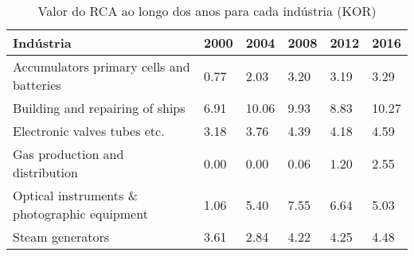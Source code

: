 \begin{table}
\centering
\caption{Valor do RCA ao longo dos anos para cada indústria (KOR)}
\begin{tabular}{p{6cm}p{1.5cm}p{1.5cm}p{1.5cm}p{1.5cm}p{1.5cm}}
\toprule
                                   Indústria & 2000 &  2004 & 2008 & 2012 &  2016 \\
\midrule
    Accumulators primary cells and batteries & 0.77 &  2.03 & 3.20 & 3.19 &  3.29 \\
             Building and repairing of ships & 6.91 & 10.06 & 9.93 & 8.83 & 10.27 \\
                Electronic valves tubes etc. & 3.18 &  3.76 & 4.39 & 4.18 &  4.59 \\
             Gas production and distribution & 0.00 &  0.00 & 0.06 & 1.20 &  2.55 \\
Optical instruments \& photographic equipment & 1.06 &  5.40 & 7.55 & 6.64 &  5.03 \\
                            Steam generators & 3.61 &  2.84 & 4.22 & 4.25 &  4.48 \\
\bottomrule
\end{tabular}
\end{table}
